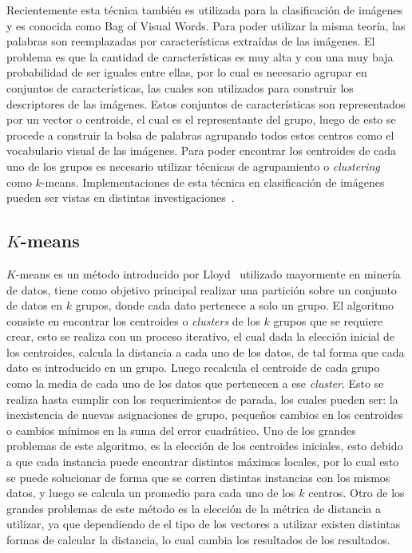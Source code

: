 Recientemente esta técnica también es utilizada para la clasificación de imágenes y es conocida como Bag of Visual Words. Para poder utilizar la misma teoría, las palabras son reemplazadas por características extraídas de las imágenes. El problema es que la cantidad de características es muy alta y con una muy baja probabilidad de ser iguales entre ellas, por lo cual es necesario agrupar en conjuntos de características, las cuales son utilizados para construir los descriptores de las imágenes. Estos conjuntos de características son representados por un vector o centroide, el cual es el representante del grupo, luego de esto se procede a construir la bolsa de palabras agrupando todos estos centros como el vocabulario visual de las imágenes. Para poder encontrar los centroides de cada uno de los grupos es necesario utilizar técnicas de agrupamiento o \textit{clustering} como $k$-means. Implementaciones de esta técnica en clasificación de imágenes pueden ser vistas en distintas investigaciones~\cite{Csurka2004,Dollar2005,Sivic2009}.

	\subsection{$K$-means}
	\label{sec:k-means}
	$K$-means es un método introducido por Lloyd~\cite{Lloyd1982} utilizado mayormente en minería de datos, tiene como objetivo principal realizar una partición sobre un conjunto de datos en $k$ grupos, donde cada dato pertenece a solo un grupo.
	El algoritmo consiste en encontrar los centroides o \textit{clusters} de los $k$ grupos que se requiere crear, esto se realiza con un proceso iterativo, el cual dada la elección inicial de los centroides, calcula la distancia a cada uno de los datos, de tal forma que cada dato es introducido en un grupo. Luego recalcula el centroide de cada grupo como la media de cada uno de los datos que pertenecen a ese \textit{cluster}. Esto se realiza hasta cumplir con los requerimientos de parada, los cuales pueden ser: la inexistencia de nuevas asignaciones de grupo, pequeños cambios en los centroides o cambios mínimos en la suma del error cuadrático.
	Uno de los grandes problemas de este algoritmo, es la elección de los centroides iniciales, esto debido a que cada instancia puede encontrar distintos máximos locales, por lo cual esto se puede solucionar de forma que se corren distintas instancias con los mismos datos, y luego se calcula un promedio para cada uno de los $k$ centros.
	Otro de los grandes problemas de este método es la elección de la métrica de distancia a utilizar, ya que dependiendo de el tipo de los vectores a utilizar existen distintas formas de calcular la distancia, lo cual cambia los resultados de los resultados.
			
